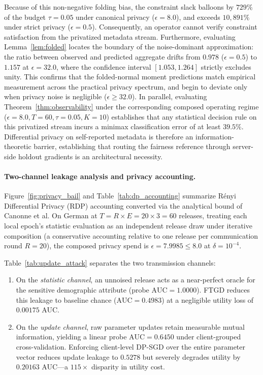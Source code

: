 \documentclass[preprint,12pt]{elsarticle}
\theoremstyle{plain}
\theoremstyle{definition}
\theoremstyle{remark}
\begin{document}
Because of this non-negative folding bias, the constraint slack balloons by $729\%$ of the budget $\tau = 0.05$ under canonical privacy ($\epsilon = 8.0$), and exceeds $10{,}891\%$ under strict privacy ($\epsilon = 0.5$). Consequently, an operator cannot verify constraint satisfaction from the privatized metadata stream. Furthermore, evaluating Lemma~\ref{lem:folded} locates the boundary of the noise-dominant approximation: the ratio between observed and predicted aggregate drifts from $0.978$ ($\epsilon = 0.5$) to $1.157$ at $\epsilon = 32.0$, where the confidence interval $[1.053, 1.264]$ strictly excludes unity. This confirms that the folded-normal moment predictions match empirical measurement across the practical privacy spectrum, and begin to deviate only when privacy noise is negligible ($\epsilon \ge 32.0$). In parallel, evaluating Theorem~\ref{thm:observability} under the corresponding composed operating regime ($\epsilon=8.0, T=60, \tau=0.05, K=10$) establishes that any statistical decision rule on this privatized stream incurs a minimax classification error of at least $39.5\%$. Differential privacy on self-reported metadata is therefore an information-theoretic barrier, establishing that routing the fairness reference through server-side holdout gradients is an architectural necessity.

\paragraph{Two-channel leakage analysis and privacy accounting.}
Figure~\ref{fig:privacy_bail} and Table~\ref{tab:dp_accounting} summarize R\'enyi Differential Privacy (RDP) accounting converted via the analytical bound of Canonne et al. On German at $T = R \times E = 20 \times 3 = 60$ releases, treating each local epoch's statistic evaluation as an independent release draw under iterative composition (a conservative accounting relative to one release per communication round $R=20$), the composed privacy spend is $\epsilon = 7.9985 \le 8.0$ at $\delta = 10^{-4}$.

Table~\ref{tab:update_attack} separates the two transmission channels:
\begin{enumerate}
\item On the \emph{statistic channel}, an unnoised release acts as a near-perfect oracle for the sensitive demographic attribute (probe $\mathrm{AUC} = 1.0000$). FTGD reduces this leakage to baseline chance ($\mathrm{AUC} = 0.4983$) at a negligible utility loss of $0.00175$ AUC.
\item On the \emph{update channel}, raw parameter updates retain measurable mutual information, yielding a linear probe $\mathrm{AUC} = 0.6450$ under client-grouped cross-validation. Enforcing client-level DP-SGD over the entire parameter vector reduces update leakage to $0.5278$ but severely degrades utility by $0.20163$ AUC---a $115\times$ disparity in utility cost.
\end{enumerate}
\end{document}
